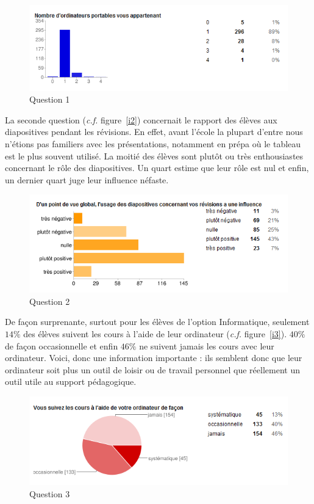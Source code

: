 \documentclass[a4paper,11pt,french]{article}
\begin{document}
\begin{figure}[h!]
\includegraphics[width=\textwidth]{i1.PNG}
\caption{Question 1}
\label{i1}
\end{figure}

La seconde question (\textit{c.f.} figure~\vref{i2}) concernait le rapport des élèves aux diapositives pendant les révisions. En effet, avant l’école la plupart d’entre nous n’étions pas familiers avec les présentations, notamment en prépa où le tableau est le plus souvent utilisé. La moitié des élèves sont plutôt ou très enthousiastes concernant le rôle des diapositives. Un quart estime que leur rôle est nul et enfin, un dernier quart juge leur influence néfaste.\\

\begin{figure}[h!]
\includegraphics[width=\textwidth]{i2.PNG}
\caption{Question 2}
\label{i2}
\end{figure}


De façon surprenante, surtout pour les élèves de l’option Informatique, seulement $14\%$ des élèves suivent les cours à l’aide de leur ordinateur (\textit{c.f.} figure~\vref{i3}). $40\%$ de façon occasionnelle et enfin $46\%$ ne suivent jamais les cours avec leur ordinateur. Voici, donc une information importante : ils semblent donc que leur ordinateur soit plus un outil de loisir ou de travail personnel que réellement un outil utile au support pédagogique.

\begin{figure}[h!]
\includegraphics[width=\textwidth]{i3.PNG}
\caption{Question 3}
\label{i3}
\end{figure}
\end{document}
